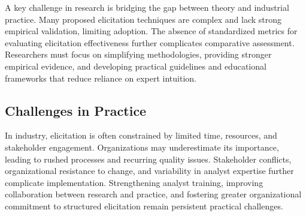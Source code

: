 A key challenge in research is bridging the gap between theory and industrial practice. Many proposed elicitation techniques are complex and lack strong empirical validation, limiting adoption. The absence of standardized metrics for evaluating elicitation effectiveness further complicates comparative assessment. Researchers must focus on simplifying methodologies, providing stronger empirical evidence, and developing practical guidelines and educational frameworks that reduce reliance on expert intuition.

\subsection{Challenges in Practice}

In industry, elicitation is often constrained by limited time, resources, and stakeholder engagement. Organizations may underestimate its importance, leading to rushed processes and recurring quality issues. Stakeholder conflicts, organizational resistance to change, and variability in analyst expertise further complicate implementation. Strengthening analyst training, improving collaboration between research and practice, and fostering greater organizational commitment to structured elicitation remain persistent practical challenges.
